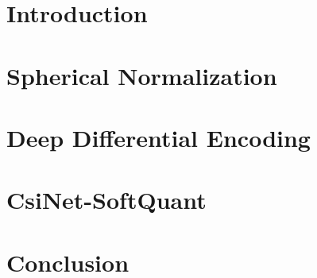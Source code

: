 \documentclass[12pt]{report}
\title{}
\author{
	\authorName\\
	\authorDepartment\\
	\authorAddress \\ %
	\authorEmail \\
}
\date{\today}
\begin{document}
	


\newpage
\tableofcontents

\newpage

\chapter{Introduction}


\chapter{Spherical Normalization}
\label{chap:sph_norm}


\chapter{Deep Differential Encoding}
\label{chap:markovnet}


\chapter{CsiNet-SoftQuant}
\label{chap:csinet_quant}


\chapter{Conclusion}


\newpage
\small


\end{document}
